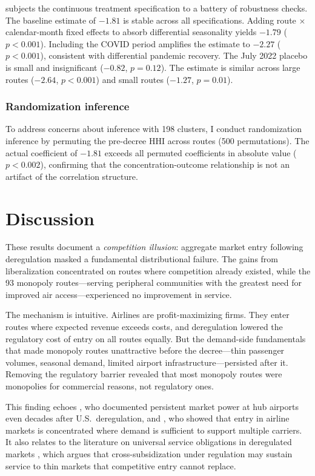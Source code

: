 \documentclass[12pt]{article}
\begin{document}
 subjects the continuous treatment specification to a battery of robustness checks. The baseline estimate of $-1.81$ is stable across all specifications. Adding route $\times$ calendar-month fixed effects to absorb differential seasonality yields $-1.79$ ($p < 0.001$). Including the COVID period amplifies the estimate to $-2.27$ ($p < 0.001$), consistent with differential pandemic recovery. The July 2022 placebo is small and insignificant ($-0.82$, $p = 0.12$). The estimate is similar across large routes ($-2.64$, $p < 0.001$) and small routes ($-1.27$, $p = 0.01$).

{\small}

\subsubsection*{Randomization inference} To address concerns about inference with 198 clusters, I conduct randomization inference by permuting the pre-decree HHI across routes (500 permutations). The actual coefficient of $-1.81$ exceeds all permuted coefficients in absolute value ($p < 0.002$), confirming that the concentration-outcome relationship is not an artifact of the correlation structure.


\section{Discussion}

These results document a \textit{competition illusion}: aggregate market entry following deregulation masked a fundamental distributional failure. The gains from liberalization concentrated on routes where competition already existed, while the 93 monopoly routes---serving peripheral communities with the greatest need for improved air access---experienced no improvement in service.

The mechanism is intuitive. Airlines are profit-maximizing firms. They enter routes where expected revenue exceeds costs, and deregulation lowered the regulatory cost of entry on all routes equally. But the demand-side fundamentals that made monopoly routes unattractive before the decree---thin passenger volumes, seasonal demand, limited airport infrastructure---persisted after it. Removing the regulatory barrier revealed that most monopoly routes were monopolies for commercial reasons, not regulatory ones.

This finding echoes \citet{borenstein2011}, who documented persistent market power at hub airports even decades after U.S.\ deregulation, and \citet{berry1992}, who showed that entry in airline markets is concentrated where demand is sufficient to support multiple carriers. It also relates to the literature on universal service obligations in deregulated markets \citep{gruber2005, calzada2009}, which argues that cross-subsidization under regulation may sustain service to thin markets that competitive entry cannot replace.
\end{document}
